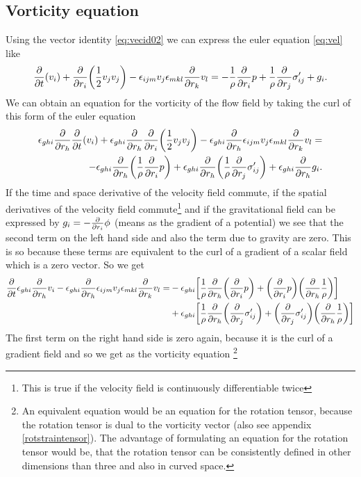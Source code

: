 \subsection{Vorticity equation}
Using the vector identity \eqref{eq:vecid02} we can express the euler 
equation \eqref{eq:vel} like
\begin{align}
\frac{\partial}{\partial t}(v_i) + \frac{\partial}{\partial r_i} { \left( \frac{1}{2} v_j v_j \right) }
- \epsilon_{ijm} v_j \epsilon_{mkl} \frac{\partial}{\partial r_k} v_l = -\frac{1}{\rho}\frac{\partial}{\partial r_i}p +
\frac{1}{\rho}\frac{\partial}{\partial r_j}\sigma'_{ij} + g_i.
\end{align}
We can obtain an equation for the vorticity of the flow field by taking the
curl of this form of the euler equation
\begin{align}
\begin{split}
\epsilon_{ghi}\frac{\partial}{\partial r_h}\frac{\partial}{\partial t}(v_i) 
+\epsilon_{ghi}\frac{\partial}{\partial r_h} \frac{\partial}{\partial r_i}{ \left( \frac{1}{2} v_j v_j \right) }
-\epsilon_{ghi}\frac{\partial}{\partial r_h} \epsilon_{ijm} v_j \epsilon_{mkl} \frac{\partial}{\partial r_k} v_l =\\
-\epsilon_{ghi}\frac{\partial}{\partial r_h}{ \left( \frac{1}{\rho}\frac{\partial}{\partial r_i}p \right) } 
+\epsilon_{ghi}\frac{\partial}{\partial r_h}{ \left( \frac{1}{\rho}\frac{\partial}{\partial r_j}\sigma'_{ij} \right) } 
+\epsilon_{ghi}\frac{\partial}{\partial r_h} g_i.
\end{split}
\end{align}
If the time and space derivative of the velocity field commute, if
the spatial derivatives of the velocity field commute\footnote{This is true if
the velocity field is continuously differentiable twice} and if the
gravitational field can be expressed by $g_i=-\frac{\partial}{\partial r_i}\phi$ (means as the
gradient of a potential) we see that the second term on the left hand side and
also the term due to gravity are zero. This is so because these terms are
equivalent to the curl of a gradient of a scalar field which is a zero vector.
So we get
\begin{align}
\begin{split}
\frac{\partial}{\partial t}\epsilon_{ghi}\frac{\partial}{\partial r_h}v_i
-\epsilon_{ghi}\frac{\partial}{\partial r_h} \epsilon_{ijm} v_j \epsilon_{mkl} \frac{\partial}{\partial r_k} v_l =
&-\epsilon_{ghi}{ \left[ \frac{1}{\rho}\frac{\partial}{\partial r_h}{ \left( \frac{\partial}{\partial r_i}p \right) } 
+ { \left( \frac{\partial}{\partial r_i}p \right) } { \left( \frac{\partial}{\partial r_h}\frac{1}{\rho} \right) } \right] }\\
&+\epsilon_{ghi}{ \left[ \frac{1}{\rho}\frac{\partial}{\partial r_h}{ \left( \frac{\partial}{\partial r_j}\sigma'_{ij} \right) }
+ { \left( \frac{\partial}{\partial r_j}\sigma'_{ij} \right) } { \left( \frac{\partial}{\partial r_h}\frac{1}{\rho} \right) } \right] }
\end{split}
\end{align}
The first term on the right hand side is zero again, because it is the curl
of a gradient field and so we get as the vorticity equation
\footnote{An equivalent equation would be 
an equation for the rotation tensor, because the rotation tensor is 
dual to the vorticity vector (also see appendix \ref{rotstraintensor}). 
The advantage of formulating an equation for the rotation tensor would be, 
that the rotation tensor can be consistently defined in other dimensions 
than three and also in curved space.}
